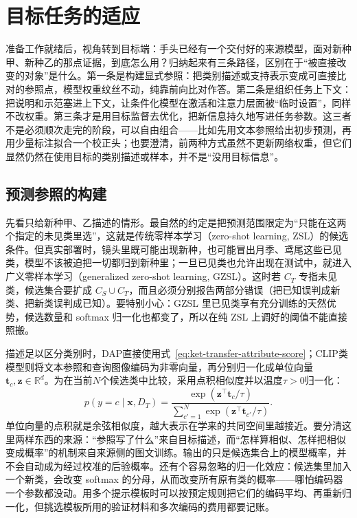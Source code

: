\section{目标任务的适应}
\label{sec:ket-transfer-adaptation}

准备工作就绪后，视角转到目标端：手头已经有一个交付好的来源模型，面对新种甲、新种乙的那点证据，到底怎么用？归纳起来有三条路径，区别在于“被直接改变的对象”是什么。第一条是构建显式参照：把类别描述或支持表示变成可直接比对的参照点，模型权重纹丝不动，纯靠前向比对作答。第二条是组织任务上下文：把说明和示范塞进上下文，让条件化模型在激活和注意力层面被“临时设置”，同样不改权重。第三条才是用目标监督去优化，把新信息持久地写进任务参数。这三者不是必须顺次走完的阶段，可以自由组合——比如先用文本参照给出初步预测，再用少量标注拟合一个校正头；也要澄清，前两种方式虽然不更新网络权重，但它们显然仍然在使用目标的类别描述或样本，并不是“没用目标信息”。

\subsection{预测参照的构建}
\label{sec:ket-transfer-references}

先看只给新种甲、乙描述的情形。最自然的约定是把预测范围限定为“只能在这两个指定的未见类里选”，这就是传统零样本学习（zero-shot learning, ZSL）的候选条件。但真实部署时，镜头里既可能出现新种，也可能冒出月季、鸢尾这些已见类，模型不该被迫把一切都归到新种里；一旦已见类也允许出现在测试中，就进入广义零样本学习（generalized zero-shot learning, GZSL）。这时若 $C_T$ 专指未见类，候选集合要扩成 $C_S\cup C_T$，而且必须分别报告两部分错误（把已知误判成新类、把新类误判成已知）。要特别小心：GZSL 里已见类享有充分训练的天然优势，候选数量和 softmax 归一化也都变了，所以在纯 ZSL 上调好的阈值不能直接照搬。

描述足以区分类别时，DAP直接使用式~\eqref{eq:ket-transfer-attribute-score}；CLIP类模型则将文本参照和查询图像编码为非零向量，再分别归一化成单位向量$\bm t_c,\bm z\in\mathbb R^d$。为在当前$N$个候选类中比较，采用点积相似度并以温度$\tau>0$归一化：
\begin{equation}
  p(y=c\mid\bm x,D_T)
  =\frac{\exp(\bm z^\top\bm t_c/\tau)}
         {\sum_{c'=1}^{N}\exp(\bm z^\top\bm t_{c'}/\tau)}.
  \label{eq:ket-transfer-text-reference}
\end{equation}
单位向量的点积就是余弦相似度，越大表示在学来的共同空间里越接近。要分清这里两样东西的来源：“参照写了什么”来自目标描述，而“怎样算相似、怎样把相似变成概率”的机制来自来源侧的图文训练。输出的只是候选集合上的模型概率，并不会自动成为经过校准的后验概率。还有个容易忽略的归一化效应：候选集里加入一个新类，会改变 softmax 的分母，从而改变所有原有类的概率——哪怕编码器一个参数都没动。用多个提示模板时可以按预定规则把它们的编码平均、再重新归一化，但挑选模板所用的验证材料和多次编码的费用都要记账。

